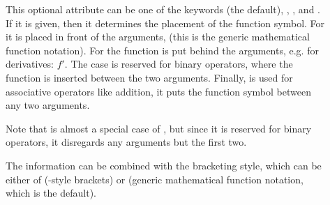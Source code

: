 \begin{description}
\item[{}] This optional attribute can be one
  of the keywords {} (the default),
  {},
  {}, and
  {}.  If it is given, then it determines the
  placement of the function symbol. For {} it
  is placed in front of the arguments, (this is the generic mathematical function
  notation). For {} the function is put
  behind the arguments, e.g.  for derivatives: $f'$. The case
  {} is reserved for binary operators, where
  the function is inserted between the two arguments. Finally,
  {} is used for associative operators like
  addition, it puts the function symbol between any two arguments.
  
  Note that {} is almost a special case of
  {}, but since it is reserved for binary
  operators, it disregards any arguments but the first two.
\item[{}] The
  {} information can be combined with the
  bracketing style, which can be either of
  {} ({}-style brackets) or
  {} (generic mathematical function
  notation, which is the default).  
  

\end{description}
